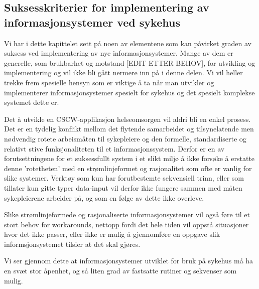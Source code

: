 \subsection{Suksesskriterier for implementering av informasjonsystemer ved sykehus}
\label{chp: suksess_sykehus}

Vi har i dette kapittelet sett på noen av elementene som kan påvirket graden av suksess ved implementering av nye informasjonsystemer. Mange av dem er generelle, som brukbarhet og motstand [EDIT ETTER BEHOV], for utvikling og implementering og vil ikke bli gått nermere inn på i denne delen. Vi vil heller trekke frem spesielle hensyn som er viktige å ta når man utvikler og implementerer informasjonsystemer spesielt for sykehus og det spesielt komplekse systemet dette er.

\noindent
Det å utvikle en CSCW-applikasjon helseomsorgen vil aldri bli en enkel prosess. Det er en tydelig konflikt mellom det flytende samarbeidet og tilsynelatende men nødvendig rotete arbeismåten til sykepleiere og den formelle, standardiserte og relativt stive funksjonaliteten til et informasjonssystem. Derfor er en av forutsettningene for et suksessfullt system i et slikt miljø å ikke forsøke å erstatte denne 'rotetheten' med en strømlinjeformet og rasjonalitet som ofte er vanlig for slike systemer. Verktøy som kun har forutbestemte sekvensiell trinn, eller som tillater kun gitte typer data-input vil derfor ikke fungere sammen med måten sykepleierene arbeider på, og som en følge av dette ikke overleve.\cite{Berg99}

\noindent
Slike strømlinjeformede og rasjonaliserte informasjonsystemer vil også føre til et stort behov for workarounds, nettopp fordi det hele tiden vil oppstå situasjoner hvor det ikke passer, eller ikke er mulig å gjennomføre en oppgave slik informsjonsystemet tilsier at det skal gjøres.

\noindent
Vi ser gjennom dette at informasjonsystemer utviklet for bruk på sykehus må ha en svæt stor åpenhet, og så liten grad av fastsatte rutiner og sekvenser som mulig.